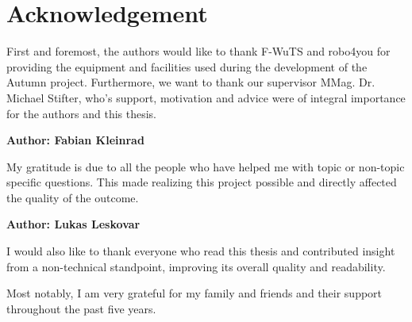 \chapter{Acknowledgement}

First and foremost, the authors would like to thank F-WuTS and robo4you for providing the equipment and facilities used during the development of the Autumn project. Furthermore, we want to thank our supervisor MMag. Dr. Michael Stifter, who's support, motivation and advice were of integral importance for the authors and this thesis.\linebreak

\textbf{Author: Fabian Kleinrad}

My gratitude is due to all the people who have helped me with topic or non-topic specific questions. This made realizing this project possible and directly affected the quality of the outcome. 

\textbf{Author: Lukas Leskovar}


I would also like to thank everyone who read this thesis and contributed insight from a non-technical standpoint, improving its overall quality and readability. 

Most notably, I am very grateful for my family and friends and their support throughout the past five years. 
